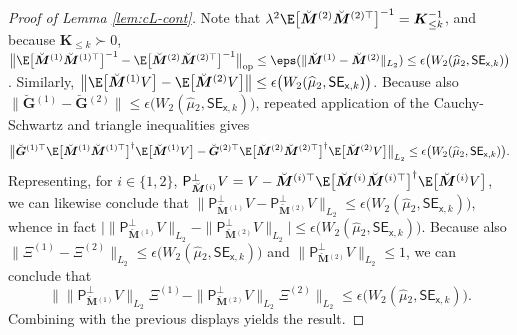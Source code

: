 \documentclass[]{article}
\def\op{{\rm op}}
\def\sx{{\mathsf x}}
\def\proj{{\mathsf P}}
\def\proj{{\mathsf P}}
\def\bK{\boldsymbol{K}}
\def\muhat{\widehat{\mu}{}}
\def\brevebM{\breve{\boldsymbol{M}}{}}
\def\brevebG{\breve{\boldsymbol{G}}{}}
\def\SE{\mathsf{SE}}
\begin{document}
\begin{proof}[Proof of Lemma \ref{lem:cL-cont}]
    Note that $\lambda^2 \E\big[\brevebM^{(2)}\brevebM^{(2)\top}\big]^{-1} = \bK_{\leq k}^{-1}$,
    and because $\bK_{\leq k} \succ 0$, 
    $\big\| \E\big[\brevebM^{(1)}\brevebM^{(1)\top}\big]^{-1} - \E\big[\brevebM^{(2)}\brevebM^{(2)\top}\big]^{-1} \big\|_{\op} \leq \eps( \| \brevebM^{(1)} - \brevebM^{(2)} \|_{L_2} ) \leq \epsilon\big(W_2(\muhat_2,\SE_{\sx,k})\big)$.
    Similarly,
    $\big\| \E\big[\brevebM^{(1)} V \big] - \E\big[\brevebM^{(2)}V\big] \big\| \leq \epsilon\big(W_2(\muhat_2,\SE_{\sx,k})\big)$.
    Because also $\| \brevebG^{(1)} - \brevebG^{(2)} \| \leq \epsilon\big(W_2(\muhat_2,\SE_{\sx,k})\big)$,
    repeated application of the Cauchy-Schwartz and triangle inequalities gives
    \begin{equation}
        \big\|
            \brevebG^{(1)\top} \E\big[\brevebM^{(1)}\brevebM^{(1)\top}\big]^\dagger \E\big[ \brevebM^{(1)} V \big]
            -
            \brevebG^{(2)\top} \E\big[\brevebM^{(2)}\brevebM^{(2)\top}\big]^\dagger \E\big[ \brevebM^{(2)} V \big]
        \big\|_{L_2}
        \leq \epsilon\big(W_2(\muhat_2,\SE_{\sx,k})\big).
    \end{equation}
    Representing, for $i \in \{1,2\}$,
    $\proj_{\brevebM^{(i)}}^\perp V = V - \brevebM^{(i)\top} \E\big[\brevebM^{(i)}\brevebM^{(i)\top}\big]^\dagger \E\big[\brevebM^{(i)}V\big] $,
    we can likewise conclude that $\big\| \proj_{\brevebM^{(1)}}^\perp V - \proj_{\brevebM^{(2)}}^\perp V \big\|_{L_2} \leq \epsilon\big(W_2(\muhat_2,\SE_{\sx,k})\big)$,
    whence in fact $\big| \big\| \proj_{\brevebM^{(1)}}^\perp V \|_{L_2} - \| \proj_{\brevebM^{(2)}}^\perp V \big\|_{L_2} \big| \leq \epsilon\big(W_2(\muhat_2,\SE_{\sx,k})\big)$.
    Because also $\| \Xi^{(1)} - \Xi^{(2)} \|_{L_2} \leq \epsilon\big(W_2(\muhat_2,\SE_{\sx,k})\big)$ and $\| \proj_{\brevebM^{(2)}}^\perp V \big\|_{L_2}  \leq 1$,
    we can conclude that 
    \begin{equation}
        \big\| 
            \| \proj_{\brevebM^{(1)}}^\perp V \|_{L_2} \Xi^{(1)}
            -
            \| \proj_{\brevebM^{(2)}}^\perp V \|_{L_2} \Xi^{(2)}
        \big\|_{L_2} \leq \epsilon\big(W_2(\muhat_2,\SE_{\sx,k})\big). 
    \end{equation}
    Combining with the previous displays yields the result.
\end{proof}
\end{document}
